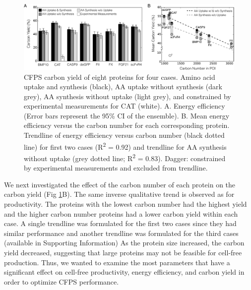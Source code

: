 \documentclass[journal=asbcd6,manuscript=article]{achemso}
\begin{document}
\begin{figure}[t!]
\centering
\includegraphics[width=1.00\textwidth]{./Figures/CarbonYield.pdf}
\caption{CFPS carbon yield of eight proteins for four cases. Amino acid uptake and synthesis (black), AA uptake without synthesis (dark grey), AA synthesis without uptake (light grey), and constrained by experimental measurements for CAT (white). A. Energy efficiency (Error bars represent the 95\% CI of the ensemble). B. Mean energy efficiency versus the carbon number for each corresponding protein. Trendline of energy efficiency versus carbon number (black dotted line) for first two cases  (R\textsuperscript{2} = 0.92) and trendline for AA synthesis without uptake (grey dotted line; R\textsuperscript{2} = 0.83). Dagger: constrained by experimental measurements and excluded from trendline.}
\label{fig:Yield}
\end{figure}
We next investigated the effect of the carbon number of each protein on the carbon yield (Fig \ref{fig:Yield}B).
The same inverse qualitative trend is observed as for productivity.
The proteins with the lowest carbon number had the highest yield and the higher carbon number proteins had a lower carbon yield within each case. 
A single trendline was formulated for the first two cases since they had similar performance and another trendline was formulated for the third cases (available in Supporting Information)
As the protein size increased, the carbon yield decreased, suggesting that large proteins may not be feasible for cell-free production.
Thus, we wanted to examine the most parameters that have a significant effect on cell-free productivity, energy efficiency, and carbon yield in order to optimize CFPS performance.
\end{document}
